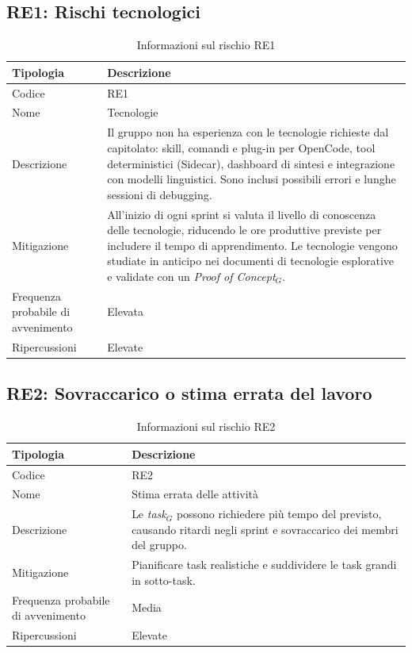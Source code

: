 \documentclass[a4paper, 11pt]{article}
\newcommand{\term}[1]{\textit{#1}$_G$} %
\begin{document}
\subsection{RE1: Rischi tecnologici}
\begin{table}[H]
\centering
\begin{tabularx}{\textwidth}{|l|X|}
    \hline
    \textbf{Tipologia} & \textbf{Descrizione} \\ \hline
    Codice & RE1 \\ \hline
    Nome & Tecnologie \\ \hline
    Descrizione & Il gruppo non ha esperienza con le tecnologie richieste dal capitolato: skill, comandi e plug-in per OpenCode, tool deterministici (Sidecar), dashboard di sintesi e integrazione con modelli linguistici. Sono inclusi possibili errori e lunghe sessioni di debugging. \\ \hline
    Mitigazione & All'inizio di ogni sprint si valuta il livello di conoscenza delle tecnologie, riducendo le ore produttive previste per includere il tempo di apprendimento. Le tecnologie vengono studiate in anticipo nei documenti di tecnologie esplorative e validate con un \term{Proof of Concept}. \\ \hline
    Frequenza probabile di avvenimento & Elevata \\ \hline
    Ripercussioni & Elevate \\ \hline
\end{tabularx}
\caption{Informazioni sul rischio RE1}
\end{table}

\subsection{RE2: Sovraccarico o stima errata del lavoro}
\begin{table}[H]
\centering
\begin{tabularx}{\textwidth}{|l|X|}
    \hline
    \textbf{Tipologia} & \textbf{Descrizione} \\ \hline
    Codice & RE2 \\ \hline
    Nome & Stima errata delle attività \\ \hline
    Descrizione & Le \term{task} possono richiedere più tempo del previsto, causando ritardi negli sprint e sovraccarico dei membri del gruppo. \\ \hline
    Mitigazione & Pianificare task realistiche e suddividere le task grandi in sotto-task. \\ \hline
    Frequenza probabile di avvenimento & Media \\ \hline
    Ripercussioni & Elevate \\ \hline
\end{tabularx}
\caption{Informazioni sul rischio RE2}
\end{table}
\end{document}
